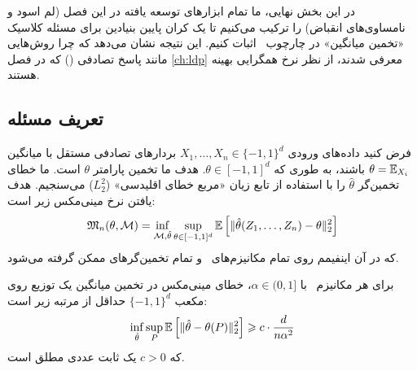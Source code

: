 در این بخش نهایی، ما تمام ابزارهای توسعه یافته در این فصل (لم اسود و نامساوی‌های انقباض) را ترکیب می‌کنیم تا یک کران پایین بنیادین برای مسئله کلاسیک «تخمین میانگین» در چارچوب \LDP\ اثبات کنیم. این نتیجه نشان می‌دهد که چرا روش‌هایی مانند پاسخ تصادفی () که در فصل \ref{ch:ldp} معرفی شدند، از نظر نرخ همگرایی بهینه هستند.

\subsection{تعریف مسئله}
فرض کنید داده‌های ورودی $X_1, \dots, X_n \in \{-1, 1\}^d$ بردارهای تصادفی مستقل با میانگین $\theta = \Eset[X_i]$ باشند، به طوری که $\theta \in [-1, 1]^d$. هدف ما تخمین پارامتر $\theta$ است.
ما خطای تخمین‌گر $\hat{\theta}$ را با استفاده از تابع زیان «مربع خطای اقلیدسی» ($L_2^2$) می‌سنجیم. هدف یافتن نرخ مینی‌مکس زیر است:
\begin{equation}
\mathfrak{M}_n(\theta, \mech) = \inf_{\mech, \hat{\theta}} \sup_{\theta \in [-1, 1]^d} \Eset \left[ \|\hat{\theta}(Z_1, \dots, Z_n) - \theta\|_2^2 \right]
\end{equation}
که در آن اینفیمم روی تمام مکانیزم‌های \LDP\ و تمام تخمین‌گرهای ممکن گرفته می‌شود.

\begin{قضیه}
\label{thm:minimax-mean}
برای هر مکانیزم \LDP\ با $\alpha \in (0, 1]$، خطای مینی‌مکس در تخمین میانگین یک توزیع روی مکعب $\{-1, 1\}^d$ حداقل از مرتبه زیر است:
\begin{equation}
\inf_{\hat{\theta}} \sup_{P} \Eset \left[ \|\hat{\theta} - \theta(P)\|_2^2 \right] \ge c \cdot \frac{d}{n \alpha^2}
\end{equation}
که $c > 0$ یک ثابت عددی مطلق است.
\end{قضیه}


